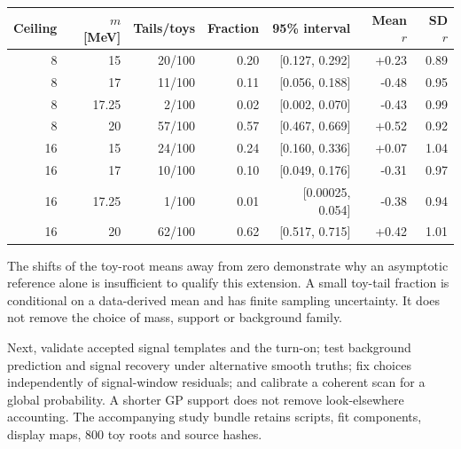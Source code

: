 \begin{center}\small
\begin{tabular}{rrrrrrr}\toprule
Ceiling & $m$ [MeV] & Tails/toys & Fraction & 95\% interval & Mean $r$ & SD $r$\\\midrule
8 & 15 & 20/100 & 0.20 & [0.127, 0.292] & +0.23 & 0.89 \\
8 & 17 & 11/100 & 0.11 & [0.056, 0.188] & -0.48 & 0.95 \\
8 & 17.25 & 2/100 & 0.02 & [0.002, 0.070] & -0.43 & 0.99 \\
8 & 20 & 57/100 & 0.57 & [0.467, 0.669] & +0.52 & 0.92 \\
16 & 15 & 24/100 & 0.24 & [0.160, 0.336] & +0.07 & 1.04 \\
16 & 17 & 10/100 & 0.10 & [0.049, 0.176] & -0.31 & 0.97 \\
16 & 17.25 & 1/100 & 0.01 & [0.00025, 0.054] & -0.38 & 0.94 \\
16 & 20 & 62/100 & 0.62 & [0.517, 0.715] & +0.42 & 1.01 \\
\bottomrule\end{tabular}\end{center}

The shifts of the toy-root means away from zero demonstrate why an asymptotic reference alone is insufficient to qualify this extension. A small toy-tail fraction is conditional on a data-derived mean and has finite sampling uncertainty. It does not remove the choice of mass, support or background family.

Next, validate accepted signal templates and the turn-on; test background prediction and signal recovery under alternative smooth truths; fix choices independently of signal-window residuals; and calibrate a coherent scan for a global probability. A shorter GP support does not remove look-elsewhere accounting. The accompanying study bundle retains scripts, fit components, display maps, 800 toy roots and source hashes.
